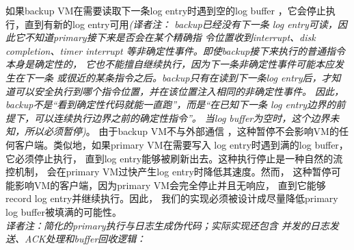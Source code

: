 如果backup VM在需要读取下一条log entry时遇到空的log buffer%
，它会停止执行，直到有新的log entry可用\emph{(译者注：%
backup已经没有下一条%
log entry可读，因此它不知道primary接下来是否会在某个精确指%
令位置收到interrupt、disk completion、timer interrupt%
等非确定性事件。即使backup接下来执行的普通指令本身是确定性的，%
它也不能擅自继续执行，因为下一条非确定性事件可能本应发生在下一条%
或很近的某条指令之后。backup只有在读到下一条log entry后，才知%
道可以安全执行到哪个指令位置，并在该位置注入相同的非确定性事件。%
因此，backup不是“看到确定性代码就能一直跑”，而是“在已知下一条%
log entry边界的前提下，可以连续执行边界之前的确定性指令”。%
当log buffer为空时，这个边界未知，所以必须暂停)}。%
由于backup VM不与外部通信%
，这种暂停不会影响VM的任何客户端。类似地，如果primary VM在需要写入%
log entry时遇到满的log buffer，它必须停止执行，%
直到log entry能够被刷新出去。这种执行停止是一种自然的流控机制，%
会在primary VM过快产生log entry时降低其速度。然而，%
这种暂停可能影响VM的客户端，因为primary VM会完全停止并且无响应，%
直到它能够record log entry并继续执行。因此，%
我们的实现必须被设计成尽量降低primary log buffer被填满的可能性。%
\\\emph{译者注：简化的primary执行与日志生成伪代码；实际实现还包含%
并发的日志发送、ACK处理和buffer回收逻辑：}

